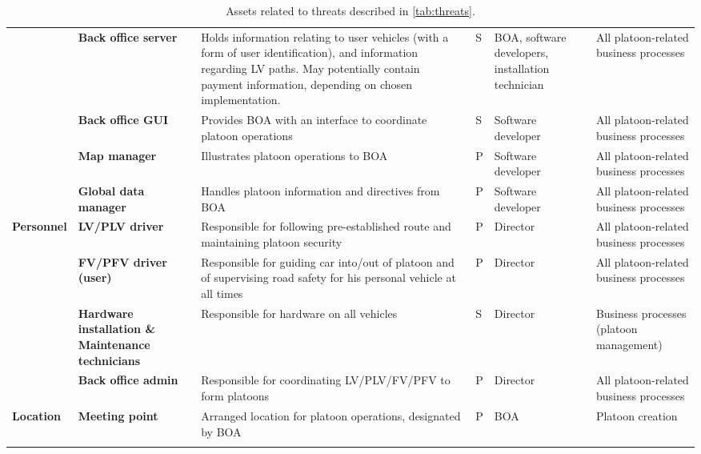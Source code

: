 \documentclass[british,11pt,a4paper]{article}
\begin{document}
\begin{longtable}{|p{2cm}|p{2cm}|p{5cm}|p{1cm}|p{2cm}|p{3cm}|}
 & \textbf{Back office server} & Holds information relating to user vehicles (with a form of user identification), and information regarding LV paths. May potentially contain payment information, depending on chosen implementation. & S & BOA, software developers, installation technician & All platoon-related business processes \\ \cline{2-6} 
 & \textbf{Back office GUI} & Provides BOA with an interface to coordinate platoon operations & S & Software developer & All platoon-related business processes \\ \cline{2-6} 
 & \textbf{Map manager} & Illustrates platoon operations to BOA & P & Software developer & All platoon-related business processes \\ \cline{2-6} 
 & \textbf{Global data manager} & Handles platoon information and directives from BOA & P & Software developer & All platoon-related business processes \\ \hline
\multirow{4}{2cm}{\textbf{Personnel}} & \textbf{LV/PLV driver} & Responsible for following pre-established route and maintaining platoon security & P & Director & All platoon-related business processes \\ \cline{2-6} 
 & \textbf{FV/PFV driver (user)} & Responsible for guiding car into/out of platoon and of supervising road safety for his personal vehicle at all times & P & Director & All platoon-related business processes \\ \cline{2-6} 
 & \textbf{Hardware installation \& Maintenance technicians} & Responsible for hardware on all vehicles & S & Director & Business processes (platoon management) \\ \cline{2-6} 
 & \textbf{Back office admin} & Responsible for coordinating LV/PLV/FV/PFV to form platoons & P & Director & All platoon-related business processes \\ \hline
\textbf{Location} & \textbf{Meeting point} & Arranged location for platoon operations, designated by BOA & P & BOA & Platoon creation \\ \hline
\caption{Assets related to threats described in \autoref{tab:threats}.}
\label{tab:assets}
\end{longtable}
\end{document}
